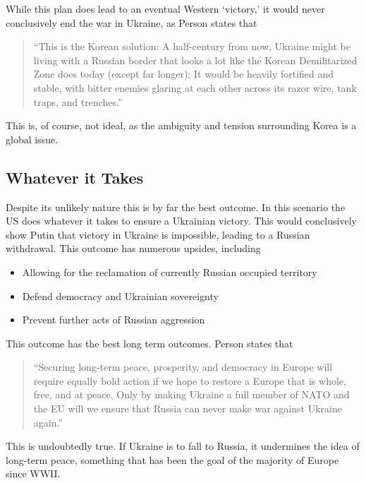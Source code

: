 \documentclass{article}
\begin{document}
        While this plan does lead to an eventual Western `victory,' it would never conclusively end the war in Ukraine, as Person states that 

        \begin{quote}
            ``This is the Korean solution: A half-century from now, Ukraine might be living with a Russian border that looks a lot like the Korean Demilitarized Zone does today (except far longer): It would be heavily fortified and stable, with bitter enemies glaring at each other across its razor wire, tank traps, and trenches.'' \parencite{person_2025}
        \end{quote}

        This is, of course, not ideal, as the ambiguity and tension surrounding Korea is a global issue. 

    \subsection{Whatever it Takes}
        Despite its unlikely nature this is by far the best outcome. In this scenario the US does whatever it takes to ensure a Ukrainian victory. This would conclusively show Putin that victory in Ukraine is impossible, leading to a Russian withdrawal. This outcome has numerous upsides, including 
            \begin{itemize}
                \item Allowing for the reclamation of currently Russian occupied territory 
                \item Defend democracy and Ukrainian sovereignty
                \item Prevent further acts of Russian aggression 
            \end{itemize}
        This outcome has the best long term outcomes. Person states that 

        \begin{quote}
            ``Securing long-term peace, prosperity, and democracy in Europe will require equally bold action if we hope to restore a Europe that is whole, free, and at peace. Only by making Ukraine a full member of NATO and the EU will we ensure that Russia can never make war against Ukraine again.''
        \end{quote}

        This is undoubtedly true. If Ukraine is to fall to Russia, it undermines the idea of long-term peace, something that has been the goal of the majority of Europe since WWII. 
\end{document}
